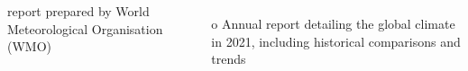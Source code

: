 
\begin{frame}
  \begin{small}
              
  \begin{columns}
   report prepared by World Meteorological Organisation (WMO)
    \begin{itemize}\setlength\itemsep{2.0ex}\footnotesize
      \item[o] Annual report detailing the global climate in 2021, including historical comparisons and trends
    \end{itemize}
  \end{columns}

  \end{small}
  \end{frame}

